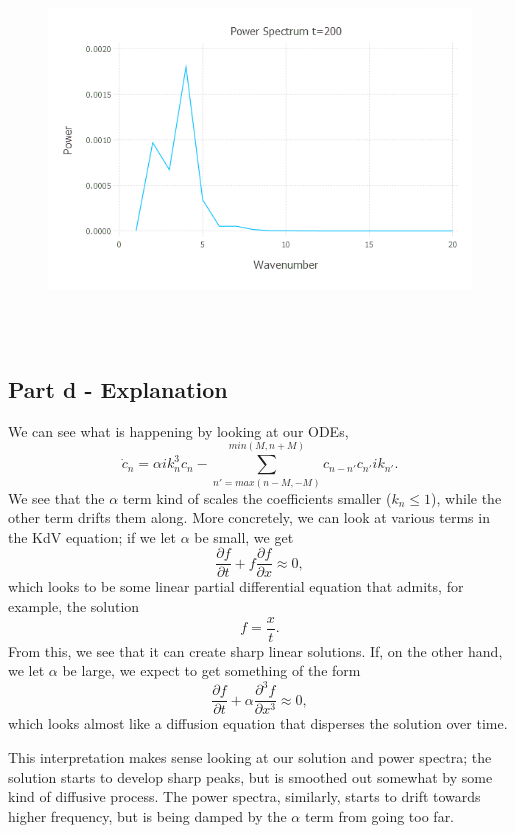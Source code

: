 \documentclass{article}
\begin{document}
\begin{figure}[H]
	\includegraphics[width=6in,height=4in]{"q4_ps_200"}
\end{figure}

\subsection{Part d - Explanation}
We can see what is happening by looking at our ODEs,
$$\dot{c}_n = \alpha ik_n^3c_n - \sum_{n'=max(n-M,-M)}^{min(M, n+M)}c_{n-n'}c_{n'}ik_{n'}.$$
We see that the $\alpha$ term kind of scales the coefficients smaller ($k_n \leq 1$), while the other term drifts them along. More concretely, we can look at various terms in the KdV equation; if we let $\alpha$ be small, we get
$$\frac{\partial f}{\partial t} + f\frac{\partial f}{\partial x} \approx 0,$$
which looks to be some linear partial differential equation that admits, for example, the solution
$$f = \frac{x}{t}.$$
From this, we see that it can create sharp linear solutions. If, on the other hand, we let $\alpha$ be large, we expect to get something of the form
$$\frac{\partial f}{\partial t} + \alpha \frac{\partial^3 f}{\partial x^3} \approx 0,$$
which looks almost like a diffusion equation that disperses the solution over time.

This interpretation makes sense looking at our solution and power spectra; the solution starts to develop sharp peaks, but is smoothed out somewhat by some kind of diffusive process. The power spectra, similarly, starts to drift towards higher frequency, but is being damped by the $\alpha$ term from going too far.
\end{document}
